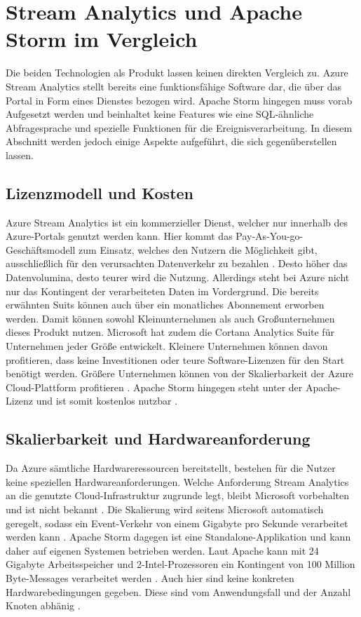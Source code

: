 \section{Stream Analytics und Apache Storm im Vergleich}
Die beiden Technologien als Produkt lassen keinen direkten Vergleich zu. Azure Stream Analytics stellt bereits eine funktionsfähige Software dar, die über das Portal in Form eines Dienstes bezogen wird. Apache Storm hingegen muss vorab Aufgesetzt werden und beinhaltet keine Features wie eine SQL-ähnliche Abfragesprache und spezielle Funktionen für die Ereignisverarbeitung. In diesem Abschnitt werden jedoch einige Aspekte aufgeführt, die sich gegenüberstellen lassen. 

\subsection{Lizenzmodell und Kosten}
Azure Stream Analytics ist ein kommerzieller Dienst, welcher nur innerhalb des Azure-Portals genutzt werden kann. Hier kommt das Pay-As-You-go-Geschäftsmodell zum Einsatz, welches den Nutzern die Möglichkeit gibt, ausschließlich für den verursachten Datenverkehr zu bezahlen \cite{Pricing.2017}. Desto höher das Datenvolumina, desto teurer wird die Nutzung. Allerdings steht bei Azure nicht nur das Kontingent der verarbeiteten Daten im Vordergrund. Die bereits erwähnten Suits können auch über ein monatliches Abonnement erworben werden. Damit können sowohl Kleinunternehmen als auch Großunternehmen dieses Produkt nutzen. Microsoft hat zudem die Cortana Analytics Suite für Unternehmen jeder Größe entwickelt. Kleinere Unternehmen können davon profitieren, dass keine Investitionen oder teure Software-Lizenzen für den Start benötigt werden. Größere Unternehmen können von der Skalierbarkeit der Azure Cloud-Plattform profitieren \cite{Azure.2017}. Apache Storm hingegen steht unter der Apache-Lizenz und ist somit kostenlos nutzbar \cite{lizenz.2004}.

\subsection{Skalierbarkeit und Hardwareanforderung}
Da Azure sämtliche Hardwareressourcen bereitstellt, bestehen für die Nutzer keine speziellen Hardwareanforderungen. Welche Anforderung Stream Analytics an die genutzte Cloud-Infrastruktur zugrunde legt, bleibt Microsoft vorbehalten und ist nicht bekannt \cite{samacha.2017}. Die Skalierung wird seitens Microsoft automatisch geregelt, sodass ein Event-Verkehr von einem Gigabyte pro Sekunde verarbeitet werden kann \cite{samacha.19.12.2017b}. Apache Storm dagegen ist eine Standalone-Applikation und kann daher auf eigenen Systemen betrieben werden. Laut Apache kann mit 24 Gigabyte Arbeitsspeicher und 2-Intel-Prozessoren ein Kontingent von 100 Million Byte-Messages verarbeitet werden \cite{apachescale.2017}. Auch hier sind keine konkreten Hardwarebedingungen gegeben. Diese sind vom Anwendungsfall und der Anzahl Knoten abhänig \cite{samacha.2017}.

